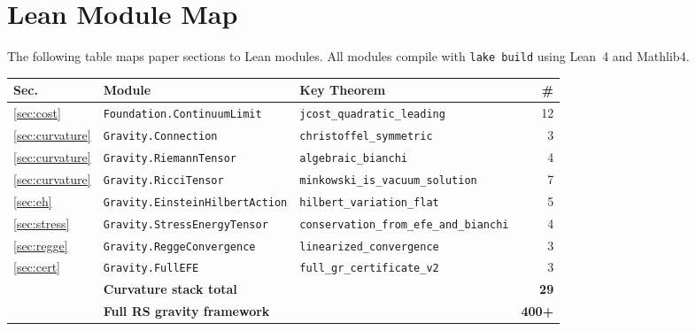\documentclass[11pt,a4paper]{article}
\newcommand{\lean}[1]{\texttt{#1}}
\begin{document}
\appendix
\section{Lean Module Map}
\label{sec:lean}

The following table maps paper sections to Lean modules.
All modules compile with \texttt{lake build} using Lean~4 and Mathlib4.

\begin{center}
\small
\begin{tabular}{lp{4.2cm}p{4.5cm}r}
\toprule
\textbf{Sec.} & \textbf{Module} & \textbf{Key Theorem} & \textbf{\#} \\
\midrule
\ref{sec:cost} & \lean{Foundation.ContinuumLimit} & \lean{jcost\_quadratic\_leading} & 12 \\
\ref{sec:curvature} & \lean{Gravity.Connection} & \lean{christoffel\_symmetric} & 3 \\
\ref{sec:curvature} & \lean{Gravity.RiemannTensor} & \lean{algebraic\_bianchi} & 4 \\
\ref{sec:curvature} & \lean{Gravity.RicciTensor} & \lean{minkowski\_is\_vacuum\_solution} & 7 \\
\ref{sec:eh} & \lean{Gravity.EinsteinHilbertAction} & \lean{hilbert\_variation\_flat} & 5 \\
\ref{sec:stress} & \lean{Gravity.StressEnergyTensor} & \lean{conservation\_from\_efe\_and\_bianchi} & 4 \\
\ref{sec:regge} & \lean{Gravity.ReggeConvergence} & \lean{linearized\_convergence} & 3 \\
\ref{sec:cert} & \lean{Gravity.FullEFE} & \lean{full\_gr\_certificate\_v2} & 3 \\
\midrule
& \textbf{Curvature stack total} & & \textbf{29} \\
& \textbf{Full RS gravity framework} & & \textbf{400+} \\
\bottomrule
\end{tabular}
\end{center}
\end{document}
